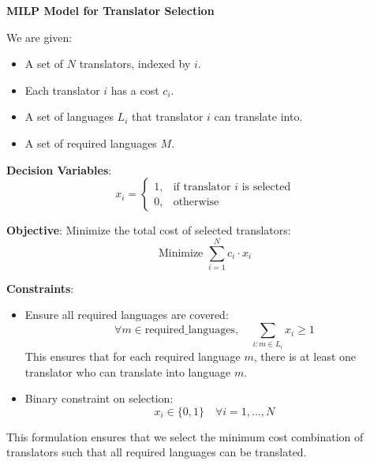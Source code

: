 \documentclass{article}
\begin{document}
\textbf{MILP Model for Translator Selection}

We are given:
\begin{itemize}
    \item A set of $N$ translators, indexed by $i$.
    \item Each translator $i$ has a cost $c_i$.
    \item A set of languages $L_i$ that translator $i$ can translate into.
    \item A set of required languages $M$.
\end{itemize}

\textbf{Decision Variables}:
\[
x_i = 
\begin{cases} 
1, & \text{if translator } i \text{ is selected} \\
0, & \text{otherwise}
\end{cases}
\]

\textbf{Objective}:
Minimize the total cost of selected translators:
\[
\text{Minimize } \sum_{i=1}^{N} c_i \cdot x_i
\]

\textbf{Constraints}:
\begin{itemize}
    \item Ensure all required languages are covered:
    \[
    \forall m \in \text{required\_languages}, \quad \sum_{i: m \in L_i} x_i \geq 1
    \]
    This ensures that for each required language $m$, there is at least one translator who can translate into language $m$.

    \item Binary constraint on selection:
    \[
    x_i \in \{0, 1\} \quad \forall i = 1, \ldots, N
    \]
\end{itemize}

This formulation ensures that we select the minimum cost combination of translators such that all required languages can be translated.
\end{document}
